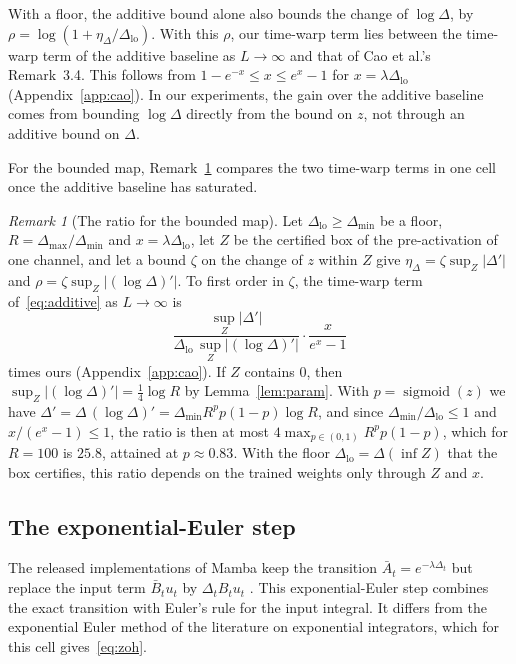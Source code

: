 \documentclass[11pt, a4paper]{article}
\theoremstyle{remark}
\newtheorem{remark}[proposition]{Remark}
\theoremstyle{plain}
\newcommand{\Abar}{\bar{A}}
\newcommand{\Bbar}{\bar{B}}
\begin{document}
With a floor, the additive bound alone also bounds the change of $\log\Delta$, by
$\rho = \log(1 + \eta_\Delta/\Delta_{\mathrm{lo}})$. With this $\rho$, our time-warp term lies
between the time-warp term of the additive baseline as $L \to \infty$ and that of Cao et al.'s
Remark~3.4. This follows from $1 - e^{-x} \le x \le e^{x} - 1$ for $x = \lambda\Delta_{\mathrm{lo}}$
(Appendix~\ref{app:cao})\@. In our experiments, the gain over the additive baseline comes
from bounding $\log\Delta$ directly from the bound on $z$, not through an additive bound on
$\Delta$.

For the bounded map, Remark~\ref{rem:cap} compares the two time-warp terms in one cell once the
additive baseline has saturated.

\begin{remark}[The ratio for the bounded map]
\label{rem:cap}
Let $\Delta_{\mathrm{lo}} \ge \Delta_{\min}$ be a floor, $R = \Delta_{\max}/\Delta_{\min}$ and
$x = \lambda\Delta_{\mathrm{lo}}$, let $Z$ be the certified box of the pre-activation of one
channel, and let a bound $\zeta$ on the change of $z$ within $Z$ give
$\eta_\Delta = \zeta\sup_Z|\Delta'|$ and $\rho = \zeta\sup_Z|(\log\Delta)'|$. To first order in
$\zeta$, the time-warp term of~\eqref{eq:additive} as
$L \to \infty$ is
\[
  \frac{\sup_{Z} |\Delta'|}{\Delta_{\mathrm{lo}}\, \sup_{Z} |(\log\Delta)'|} \cdot \frac{x}{e^{x} - 1}
\]
times ours (Appendix~\ref{app:cao})\@. If $Z$ contains $0$, then
$\sup_Z |(\log\Delta)'| = \tfrac14 \log R$ by Lemma~\ref{lem:param}. With
$p = \operatorname{sigmoid}(z)$ we have $\Delta' = \Delta\,(\log\Delta)' = \Delta_{\min} R^{p}
p(1 - p)\log R$, and since $\Delta_{\min}/\Delta_{\mathrm{lo}} \le 1$ and $x/(e^{x} - 1) \le 1$,
the ratio is then at most $4\max_{p \in (0,1)} R^{p} p(1 - p)$, which for
$R = 100$ is $25.8$, attained at $p \approx 0.83$. With the floor
$\Delta_{\mathrm{lo}} = \Delta(\inf Z)$ that the box certifies, this ratio depends on the trained
weights only through $Z$ and $x$.
\end{remark}

\subsection{The exponential-Euler step}
\label{sec:euler}

The released implementations of Mamba keep the transition
$\Abar_t = e^{-\lambda\Delta_t}$ but replace the input term $\Bbar_t u_t$ by $\Delta_t B_t u_t$
\citep[Section~3.1]{lahoti2026mamba3}. This exponential-Euler step combines the exact transition
with Euler's rule for the input integral. It differs from the exponential Euler method of the
literature on exponential integrators, which for this cell gives~\eqref{eq:zoh}.
\end{document}
